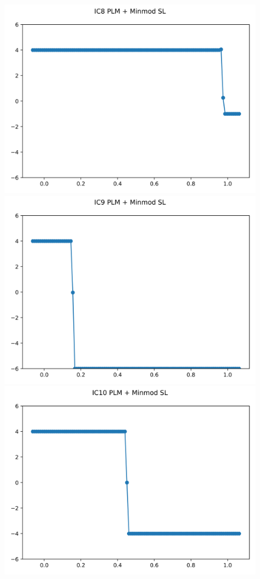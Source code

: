 \documentclass{article}
\begin{document}
\begin{figure}[t]
        \includegraphics[width=.95\textwidth]{../../code/hires_IC8Methodpm_plot.png}
        \includegraphics[width=.95\textwidth]{../../code/hires_IC9Methodpm_plot.png}
        \includegraphics[width=.95\textwidth]{../../code/hires_IC10Methodpm_plot.png}

\end{figure}
\end{document}

